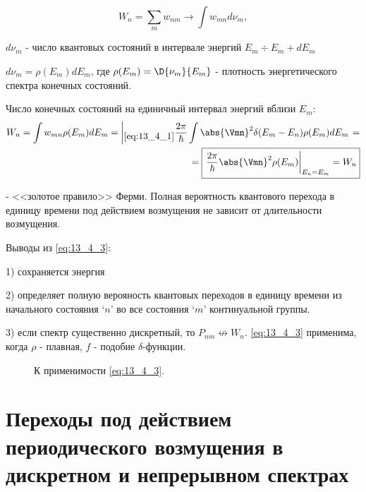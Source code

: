 $$
W_n = \sum_m w_{nm} \to \int w_{mn} d \nu_m,
$$

$d \nu_m$ - число квантовых состояний в интервале энергий $E_m \div E_m + dE_m$

$\boxed{d \nu_m = \rho(E_m) dE_m}$, где $\rho(E_m) = \D{\nu_m}{E_m}$ - плотность энергетического спектра конечных состояний.

Число конечных состояний на единичный интервал энергий вблизи $E_m$:
\begin{eqnarray}
W_n = \int w_{mn} \rho(E_m)dE_m = \left |_{\eqref{eq:13_4_1}} \dfrac{2\pi}{\hbar} \int \abs{\Vmn}^2 \delta(E_m - E_n) \rho(E_m)dE_m \right .= \nonumber \\
\label{eq:13_4_3} = \boxed{ \left. \frac{2\pi}{\hbar} \abs{\Vmn}^2 \rho(E_m) \right|_{E_n = E_m} = W_n}
\end{eqnarray}

- <<золотое правило>> Ферми. Полная вероятность квантового перехода в единицу времени под действием возмущения не зависит от длительности возмущения.

Выводы из \eqref{eq:13_4_3}:

1) сохраняется энергия

2) определяет полную верояность квантовых переходов в единицу времени из начального состояния `$n$' во все состояния `$m$' континуальной группы. 

3) если спектр существенно дискретный, то $P_{nm} \not \leftrightarrow W_n$. \eqref{eq:13_4_3} применима, когда $\rho$ - плавная, $f$ - подобие $\delta$-функции.

\begin{figure}[h!]
\centering
{}
\caption{К применимости \eqref{eq:13_4_3}.} \label{fig:13_4}
\end{figure}

\section{Переходы под действием периодического возмущения в дискретном и непрерывном спектрах}


